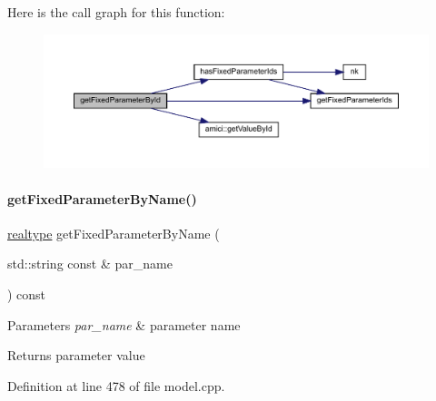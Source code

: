 Here is the call graph for this function\+:
\nopagebreak
\begin{figure}[H]
\begin{center}
\leavevmode
\includegraphics[width=350pt]{classamici_1_1_model_acc647ebbeaf0be737c7c165fa77eeca5_cgraph}
\end{center}
\end{figure}
\mbox{\label{classamici_1_1_model_a99cc00a08b2f2d87d3eac047d00a7c57}} 
\paragraph{\texorpdfstring{get\+Fixed\+Parameter\+By\+Name()}{getFixedParameterByName()}}
{\footnotesize\ttfamily \mbox{\hyperlink{namespaceamici_a1bdce28051d6a53868f7ccbf5f2c14a3}{realtype}} get\+Fixed\+Parameter\+By\+Name (\begin{DoxyParamCaption}\item[{std\+::string const \&}]{par\+\_\+name }\end{DoxyParamCaption}) const}


\begin{DoxyParams}{Parameters}
{\em par\+\_\+name} & parameter name \\
\hline
\end{DoxyParams}
\begin{DoxyReturn}{Returns}
parameter value 
\end{DoxyReturn}


Definition at line 478 of file model.\+cpp.

